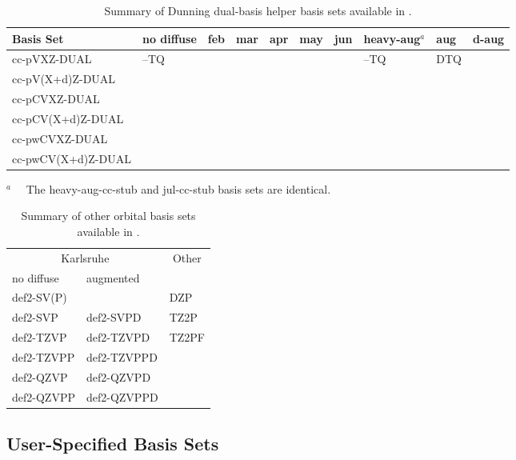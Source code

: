 \begin{table}[!htbp]
\begin{footnotesize}
\caption{Summary of Dunning dual-basis helper basis sets available in \PSIfour.} \label{table:basisDunningDUAL}
\parsep 10pt
\begin{center}
\begin{tabular}{llllllllll}
\hline\hline
Basis Set            & no diffuse & feb & mar & apr & may & jun & heavy-aug$^a$ & aug & d-aug \\
\hline
cc-pVXZ-DUAL         & --TQ &  &  &  &  &  & --TQ & DTQ &  \\
cc-pV(X+d)Z-DUAL     \\
cc-pCVXZ-DUAL        \\
cc-pCV(X+d)Z-DUAL    \\
cc-pwCVXZ-DUAL       \\
cc-pwCV(X+d)Z-DUAL   \\
\hline\hline
\end{tabular}
\end{center}
$^a\quad$ The heavy-aug-cc-stub and jul-cc-stub basis sets are identical.
\end{footnotesize}
\end{table}


\begin{table}[!htbp]
\begin{footnotesize}
\caption{Summary of other orbital basis sets available in \PSIfour.} \label{table:basisOther}
\parsep 10pt
\begin{center}
\begin{tabular}{lll}
\hline\hline
\multicolumn{2}{c}{Karlsruhe} & \multicolumn{1}{c}{Other} \\
no diffuse & augmented & \\
\hline
def2-SV(P)   &             & DZP   \\
def2-SVP     & def2-SVPD   & TZ2P  \\
def2-TZVP    & def2-TZVPD  & TZ2PF \\
def2-TZVPP   & def2-TZVPPD &       \\
def2-QZVP    & def2-QZVPD  &       \\
def2-QZVPP   & def2-QZVPPD &       \\
\hline\hline
\end{tabular}
\end{center}
\end{footnotesize}
\end{table}


\subsection{User-Specified Basis Sets} \label{sec:BasisSetSpecification}

